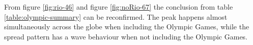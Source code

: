 From figure \ref{fig:rio-46} and figure \ref{fig:noRio-67} the conclusion from table \ref{table:olympic-summary} can be reconfirmed. The peak happens almost simultaneously across the globe when including the Olympic Games, while the spread pattern has a wave behaviour when not including the Olympic Games.
